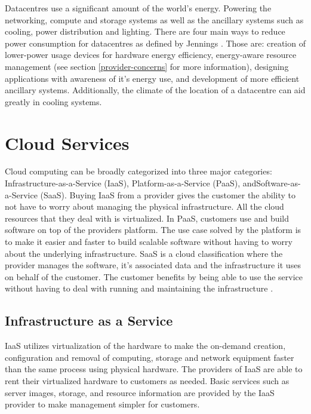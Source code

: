 \documentclass[fullapage,12pt]{article}
\begin{document}
Datacentres use a significant amount of the world's energy. Powering the networking, compute and storage systems as well as the ancillary systems such as cooling, power distribution and lighting.
There are four main ways to reduce power consumption for datacentres as defined by Jennings \cite{Jennings2015}. Those are: creation of lower-power usage devices for hardware energy efficiency, energy-aware resource management (see section \ref{provider-concerns} for more information), designing applications with awareness of it's energy use, and development of more efficient ancillary systems. Additionally, the climate of the location of a datacentre can aid greatly in cooling systems.


\section{Cloud Services} \label{sec:cloud-services}

Cloud computing can be broadly categorized into three major categories: Infrastructure-as-a-Service (IaaS), Platform-as-a-Service (PaaS), and\linebreak Software-as-a-Service (SaaS). Buying IaaS from a provider gives the customer the ability to not have to worry about managing the physical infrastructure. All the cloud resources that they deal with is virtualized. In PaaS, customers use and build software on top of the providers platform. The use case solved by the platform is to make it easier and faster to build scalable software without having to worry about the underlying infrastructure. SaaS is a cloud classification where the provider manages the software, it's associated data and the infrastructure it uses on behalf of the customer. The customer benefits by being able to use the service without having to deal with running and maintaining the infrastructure \cite{Manvi2014}.

\subsection{Infrastructure as a Service} \label{sub:iaas}

IaaS utilizes virtualization of the hardware to make the on-demand creation, configuration and removal of computing, storage and network equipment faster than the same process using physical hardware. The providers of IaaS are able to rent their virtualized hardware to customers as needed. Basic services such as server images, storage, and resource information are provided by the IaaS provider to make management simpler for customers.
\end{document}
